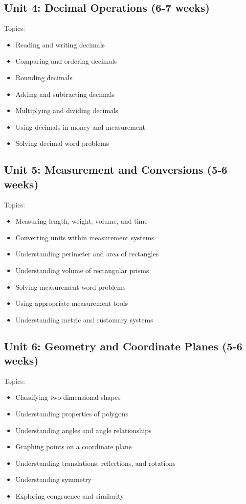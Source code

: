 \documentclass[11pt,letterpaper]{report}
\begin{document}
\subsection{Unit 4: Decimal Operations (6-7 weeks)}

Topics:
\begin{itemize}
\item Reading and writing decimals
\item Comparing and ordering decimals
\item Rounding decimals
\item Adding and subtracting decimals
\item Multiplying and dividing decimals
\item Using decimals in money and measurement
\item Solving decimal word problems
\end{itemize}

\subsection{Unit 5: Measurement and Conversions (5-6 weeks)}

Topics:
\begin{itemize}
\item Measuring length, weight, volume, and time
\item Converting units within measurement systems
\item Understanding perimeter and area of rectangles
\item Understanding volume of rectangular prisms
\item Solving measurement word problems
\item Using appropriate measurement tools
\item Understanding metric and customary systems
\end{itemize}

\subsection{Unit 6: Geometry and Coordinate Planes (5-6 weeks)}

Topics:
\begin{itemize}
\item Classifying two-dimensional shapes
\item Understanding properties of polygons
\item Understanding angles and angle relationships
\item Graphing points on a coordinate plane
\item Understanding translations, reflections, and rotations
\item Understanding symmetry
\item Exploring congruence and similarity
\end{itemize}
\end{document}
